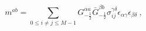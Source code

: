 \begin{equation}
 m^{ab}  = \sum_{0 \leq i \neq j \leq M-1} 
   G_{-\frac12}^{\alpha a} \bar G_{-\frac12}^{\beta b} 
 \sigma_{ij}^{\gamma \delta} 
\epsilon_{\alpha \gamma} \epsilon_{\beta \delta} ~,
\end{equation}

